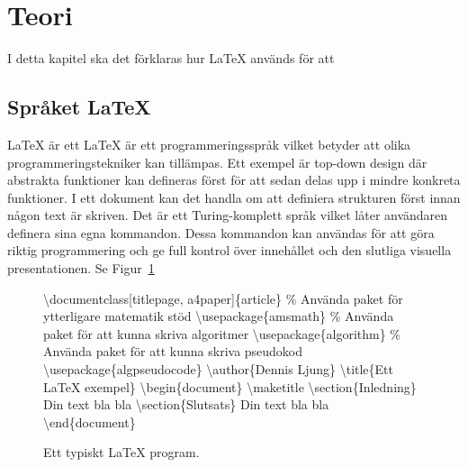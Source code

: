 \section{Teori}
I detta kapitel ska det förklaras hur {\LaTeX} används för att 

\subsection{Språket {\LaTeX}} 
{\LaTeX} är ett  
\newline
\newline
{\LaTeX} är ett programmeringsspråk vilket betyder att olika programmeringstekniker kan tillämpas. Ett exempel är top-down design där abstrakta funktioner kan defineras först för att sedan delas upp i mindre konkreta funktioner. I ett dokument kan det handla om att definiera strukturen först innan någon text är skriven. 
\newline
\newline
Det är ett Turing-komplett språk vilket låter användaren definera sina egna kommandon. Dessa kommandon kan användas för att göra riktig programmering och ge full kontrol över innehållet och den slutliga visuella presentationen. 
\newline
\newline
Se Figur~\ref{fig:latexexempel}
  
\begin{figure}[ht]
	\noindent\makebox[\linewidth]{\rule{\textwidth}{0.4pt}}
	\textbackslash documentclass[titlepage, a4paper]\{article\}
	\newline
	\newline
	\% Använda paket för ytterligare matematik stöd
	\newline
	\textbackslash usepackage\{amsmath\}
	\newline
	\% Använda paket för att kunna skriva algoritmer
	\newline
	\textbackslash usepackage\{algorithm\}
	\newline
	\% Använda paket för att kunna skriva pseudokod
	\newline
	\textbackslash usepackage\{algpseudocode\}
	\newline
	\newline
	\textbackslash author\{Dennis Ljung\}
	\newline
	\textbackslash title\{Ett {\LaTeX} exempel\}
	\newline
	\newline
	\textbackslash begin\{document\}
	\newline
	\textbackslash maketitle
	\newline
	\textbackslash section\{Inledning\}
	\newline
	Din text bla bla
	\newline
	\textbackslash section\{Slutsats\}
	\newline
	Din text bla bla
	\newline
	\textbackslash end\{document\}
	\newline
	\noindent\makebox[\linewidth]{\rule{\textwidth}{0.4pt}}
\caption{Ett typiskt {\LaTeX} program.}
\label{fig:latexexempel}
\end{figure} 

